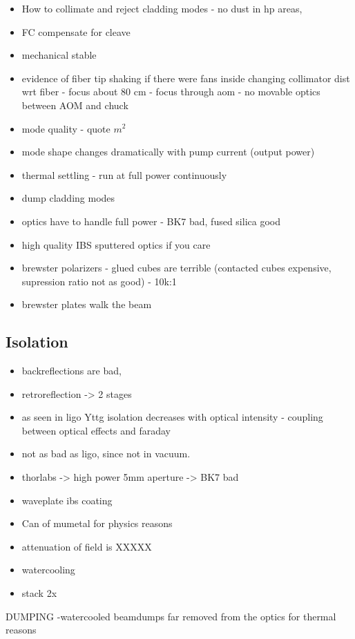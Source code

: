 \documentclass[twocolumn,aps,pra,showpacs,preprintnumbers,bibnotes]{revtex4-1}
\begin{document}
\begin{itemize}
\item How to collimate and reject cladding modes - no dust in hp areas, 
\item FC compensate for cleave
\item mechanical stable

\item evidence of fiber tip shaking if there were fans inside
changing collimator dist wrt fiber - focus about 80 cm - focus through aom - no movable optics between AOM and chuck
\item mode quality - quote $m^2$
\item mode shape changes dramatically with pump current (output power)
\item thermal settling - run at full power continuously
\item dump cladding modes
\item optics have to handle full power - BK7 bad, fused silica good
\item high quality IBS sputtered optics if you care
\item brewster polarizers - glued cubes are terrible (contacted cubes expensive, supression ratio not as good) - 10k:1
\item brewster plates walk the beam
\end{itemize}

\subsection{Isolation}
\begin{itemize}
\item backreflections are bad,
\item retroreflection -> 2 stages
\item as seen in ligo Yttg isolation decreases with optical intensity - coupling between optical effects and faraday
\item not as bad as ligo, since not in vacuum.
\item thorlabs -> high power 5mm aperture -> BK7 bad
\item waveplate ibs coating
\item Can of mumetal for physics reasons
\item attenuation of field is XXXXX
\item watercooling
\item stack 2x
\end{itemize}

DUMPING
-watercooled beamdumps far removed from the optics for thermal reasons
\end{document}
